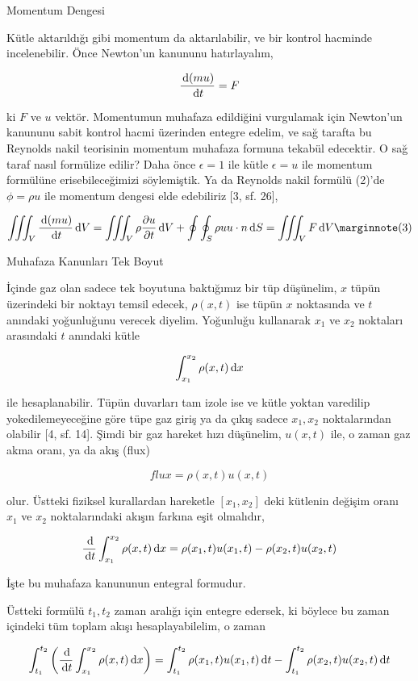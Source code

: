 \documentclass[12pt,fleqn]{article}\usepackage{../../common}
\begin{document}
Momentum Dengesi

Kütle aktarıldığı gibi momentum da aktarılabilir, ve bir kontrol hacminde
incelenebilir. Önce Newton'un kanununu hatırlayalım,

$$
\frac{\,\mathrm{d} (m u)}{\,\mathrm{d} t} = F
$$

ki $F$ ve $u$ vektör. Momentumun muhafaza edildiğini vurgulamak için Newton'un
kanununu sabit kontrol hacmi üzerinden entegre edelim, ve sağ tarafta bu
Reynolds nakil teorisinin momentum muhafaza formuna tekabül edecektir. O sağ
taraf nasıl formülize edilir? Daha önce $\epsilon = 1$ ile kütle $\epsilon = u$
ile momentum formülüne erisebileceğimizi söylemiştik. Ya da Reynolds nakil
formülü (2)'de $\phi = \rho u$ ile momentum dengesi elde edebiliriz [3, sf. 26],

$$
\iiint_V \frac{\ud (m u)}{\ud t} \ud V =
\iiint_V \rho \frac{\partial u}{\partial t} \ud V +
\oint \oint_S \rho u u \cdot n \ud S =
\iiint_V F \ud V
\mlabel{3}
$$

Muhafaza Kanunları Tek Boyut

İçinde gaz olan sadece tek boyutuna baktığımız bir tüp düşünelim, $x$ tüpün
üzerindeki bir noktayı temsil edecek, $\rho(x,t)$ ise tüpün $x$ noktasında ve
$t$ anındaki yoğunluğunu verecek diyelim. Yoğunluğu kullanarak $x_1$ ve $x_2$
noktaları arasındaki $t$ anındaki kütle

$$
\int _{x_1}^{x_2} \rho(x,t) \,\mathrm{d} x
$$

ile hesaplanabilir. Tüpün duvarları tam izole ise ve kütle yoktan varedilip
yokedilemeyeceğine göre tüpe gaz giriş ya da çıkış sadece $x_1,x_2$
noktalarından olabilir [4, sf. 14]. Şimdi bir gaz hareket hızı düşünelim,
$u(x,t)$ ile, o zaman gaz akma oranı, ya da akış (flux)

$$
flux = \rho(x,t) u(x,t)
$$

olur. Üstteki fiziksel kurallardan hareketle $[x_1,x_2]$ deki kütlenin
değişim oranı $x_1$ ve $x_2$ noktalarındaki akışın farkına eşit olmalıdır,

$$
\frac{\,\mathrm{d}}{\,\mathrm{d} t} \int _{x_1}^{x_2} \rho(x,t) \,\mathrm{d} x =
\rho(x_1,t) u(x_1,t) - \rho(x_2,t) u(x_2,t)
$$

İşte bu muhafaza kanununun entegral formudur. 

Üstteki formülü $t_1,t_2$ zaman aralığı için entegre edersek, ki böylece
bu zaman içindeki tüm toplam akışı hesaplayabilelim, o zaman

$$
\int_{t_1}^{t_2} \left( \frac{\,\mathrm{d}}{\,\mathrm{d} t} \int _{x_1}^{x_2} \rho(x,t) \,\mathrm{d} x  \right)  =
\int_{t_1}^{t_2} \rho(x_1,t) u(x_1,t) \,\mathrm{d} t -
\int_{t_1}^{t_2} \rho(x_2,t) u(x_2,t) \,\mathrm{d} t
$$
\end{document}
